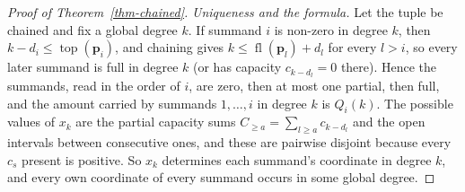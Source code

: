 \documentclass[11pt, a4paper, abstract=yes]{scrartcl}
\theoremstyle{definition}
\theoremstyle{remark}
\theoremstyle{plain}
\newcommand{\vek}[1]{\boldsymbol{#1}}
\theoremstyle{remark}
\theoremstyle{plain}
\newcommand{\tp}{\operatorname{top}}
\newcommand{\fl}{\operatorname{fl}}
\begin{document}
\begin{proof}[Proof of Theorem~\ref{thm-chained}]
\emph{Uniqueness and the formula.} Let the tuple be chained and fix a global degree \(k\). If summand
\(i\) is non-zero in degree \(k\), then \(k-d_i\le\tp(\vek p_i)\), and chaining gives
\(k\le\fl(\vek p_l)+d_l\) for every \(l>i\), so every later summand is full in degree \(k\) (or
has capacity \(c_{k-d_l}=0\) there). Hence the summands, read in the order of \(i\), are zero, then
at most one partial, then full, and the amount carried by summands \(1,\dots,i\) in degree \(k\) is
\(Q_i(k)\). The possible values of \(x_k\) are the partial capacity sums
\(C_{\ge a}=\sum_{l\ge a}c_{k-d_l}\) and the open intervals between consecutive ones, and these are
pairwise disjoint because every \(c_s\) present is positive. So \(x_k\) determines each summand's
coordinate in degree \(k\), and every own coordinate of every summand occurs in some global degree.


\end{proof}
\end{document}
